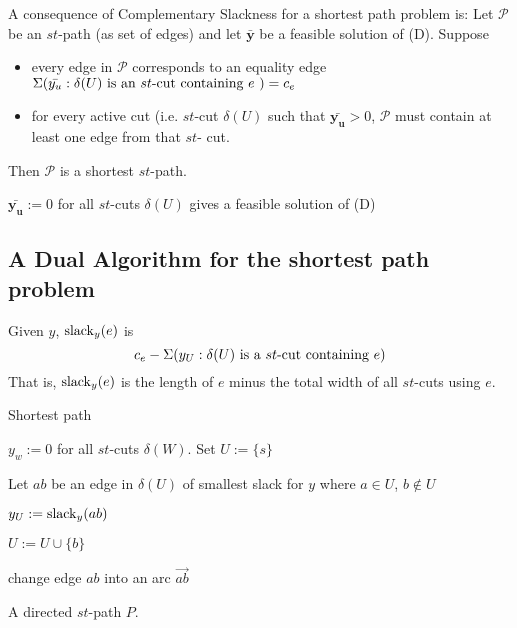 A consequence of Complementary Slackness for a shortest path problem is:
Let $ \mathcal{P} $ be an $ st $-path (as set of edges) and let
$ \bm{\bar{y}} $ be a feasible solution of (D). Suppose
\begin{itemize}
    \item every edge in $ \mathcal{P} $ corresponds to an equality edge 
    $ \Sigma(\bar{y_u}:\delta(U)\text{ is an $st$-cut containing $ e $ } )=c_e $
    \item for every active cut (i.e. $st$-cut $ \delta(U) $ such that
    $ \bm{\bar{y_u}}>0 $, $ \mathcal{P} $ must contain at least one edge from
    that $ st $- cut.
\end{itemize}
Then $ \mathcal{P} $ is a shortest $ st $-path. 

\begin{remark}
    $ \bm{\bar{y_u}}:=0 $ for all $ st $-cuts $ \delta(U) $ gives a feasible
    solution of (D)
\end{remark}

\subsection{A Dual Algorithm for the shortest path problem}
Given $ y $, $\operatorname{slack}_{y} (e)$ is
\[ c_e-\Sigma(y_U :\delta(U) \text{ is a $ st $-cut containing $ e $}) \]
That is, $ \operatorname{slack}_y(e) $ is the length of $ e $ minus the total width of all
$ st $-cuts using $ e $.

\begin{algorithm}
    \caption{Shortest path}
    $ y_w := 0 $ for all $ st $-cuts $ \delta(W) $. Set $ U:=\{s\} $

     {
        Let $ ab $ be an edge in $ \delta(U) $ of smallest slack for $ y $
        where $ a\in U $, $ b\notin U $

        $ y_U:=\operatorname{slack}_y(ab) $

        $ U:=U\cup \{b\} $

        change edge $ ab $ into an arc $ \vec{ab} $
    }

    \Return A directed $ st $-path $ P $.
\end{algorithm}